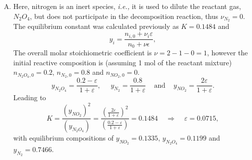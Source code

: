 \documentclass[calculator,allquestions,datasheet,mock,Pens]{exam_newMarcus2}
\newcommand{\frc}{\displaystyle\frac}
\newcommand{\ie}{{\it i.e., }}
\begin{document}
\begin{question}
\begin{enumerate}[a)]
{\begin{enumerate}[A.]
           \item Here, nitrogen is an inert species, \ie it is used to dilute the reactant gas, $N_{2}O_{4}$, but does not participate in the decomposition reaction, thus $\nu_{N_{2}}=0$.  The equilibrium constant was calculated previously as $K = 0.1484$ and 
         \begin{displaymath}
            y_{i} = \frc{n_{i,0} + \nu_{i}\varepsilon}{n_{0}+\nu\epsilon},
         \end{displaymath}
        The overall molar stoichiometric coefficient is $\nu= 2-1-0 = 1$, however the initial reactive composition is (assuming 1 mol of the reactant mixture) $n_{N_{2}O_{4},0} = 0.2$, $n_{N_{2},0} = 0.8$ and $n_{NO_{2},0}=0$.
         \begin{displaymath}
           y_{N_{2}O_{4}} = \frc{0.2-\varepsilon}{1+\varepsilon},\;\;\;\;\; y_{N_{2}} = \frc{0.8}{1+\varepsilon}\;\;\;\text{ and }\;\;\;y_{NO_{2}} = \frc{2\varepsilon}{1+\varepsilon}.
         \end{displaymath}
         Leading to~ 
         \begin{displaymath}
             K = \frac{\left(y_{NO_{2}}\right)^{2}}{\left(y_{N_{2}O_{4}}\right)} = \frc{\left(\frc{2\varepsilon}{1+\varepsilon}\right)^{2}}{\left(\frc{0.2-\varepsilon}{1+\varepsilon}\right)} = 0.1484 \;\;\;\;\Longrightarrow\;\;\;\; \varepsilon = 0.0715,
         \end{displaymath}
         with equilibrium compositions of $y_{NO_{2}} = 0.1335$, $y_{N_{2}O_{4}} = 0.1199$ and $y_{N_{2}} = 0.7466$.~ 


\end{enumerate}}
\end{enumerate}
\end{question}
\end{document}
